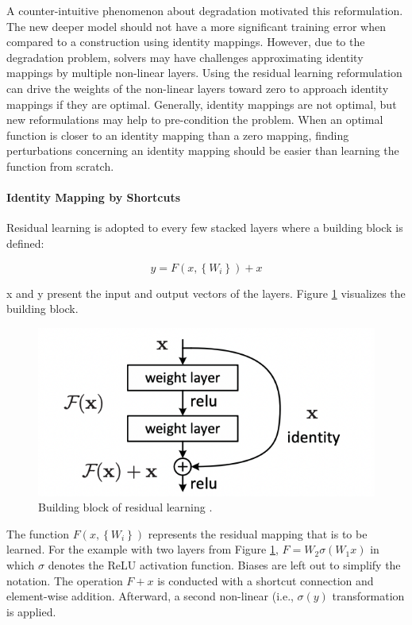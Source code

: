 \documentclass[
]{krantz}
\begin{document}
A counter-intuitive phenomenon about degradation motivated this reformulation. The new deeper model should not have a more significant training error when compared to a construction using identity mappings. However, due to the degradation problem, solvers may have challenges approximating identity mappings by multiple non-linear layers. Using the residual learning reformulation can drive the weights of the non-linear layers toward zero to approach identity mappings if they are optimal.
Generally, identity mappings are not optimal, but new reformulations may help to pre-condition the problem. When an optimal function is closer to an identity mapping than a zero mapping, finding perturbations concerning an identity mapping should be easier than learning the function from scratch.

\hypertarget{identity-mapping-by-shortcuts}{%
\paragraph{Identity Mapping by Shortcuts}\label{identity-mapping-by-shortcuts}}

Residual learning is adopted to every few stacked layers where a building block is defined:

\begin{equation}
\label{eq:ch01-02-01}
y = F  \left( x,\left\{  W_i\right\} \right) + x
\end{equation}

x and y present the input and output vectors of the layers. Figure \ref{fig:ch01-figure01} visualizes the building block.

\begin{figure}

{\centering \includegraphics[width=0.35\linewidth]{./figures/01-chapter1/resnetBlock} 

}

\caption{Building block of residual learning \citep{ResNet}.}\label{fig:ch01-figure01}
\end{figure}



The function \(F \left( x,\left\{ W_i\right\} \right)\) represents the residual mapping that is to be learned. For the example with two layers from Figure \ref{fig:ch01-figure01}, \(F = W_2\sigma\left( W_1x\right)\) in which \(\sigma\) denotes the ReLU activation function. Biases are left out to simplify the notation. The operation \(F + x\) is conducted with a shortcut connection and element-wise addition. Afterward, a second non-linear (i.e., \(\sigma \left( y \right)\) transformation is applied.
\end{document}
